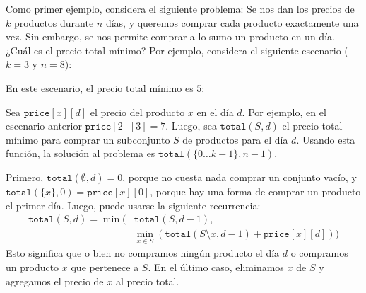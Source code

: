 Como primer ejemplo, considera el siguiente problema:
Se nos dan los precios de $k$ productos
durante $n$ días, y queremos comprar cada producto
exactamente una vez.
Sin embargo, se nos permite comprar a lo sumo un producto
en un día.
¿Cuál es el precio total mínimo?
Por ejemplo, considera el siguiente escenario ($k=3$ y $n=8$):
\begin{center}
\end{center}
En este escenario, el precio total mínimo es $5$:
\begin{center}
\end{center}

Sea $\texttt{price}[x][d]$ el precio del producto $x$
en el día $d$.
Por ejemplo, en el escenario anterior $\texttt{price}[2][3] = 7$.
Luego, sea $\texttt{total}(S,d)$ el precio total mínimo
para comprar un subconjunto $S$ de productos para el día $d$.
Usando esta función, la solución al problema es
$\texttt{total}(\{0 \ldots k-1\},n-1)$.

Primero, $\texttt{total}(\emptyset,d) = 0$,
porque no cuesta nada comprar un conjunto vacío,
y $\texttt{total}(\{x\},0) = \texttt{price}[x][0]$,
porque hay una forma de comprar un producto el primer día.
Luego, puede usarse la siguiente recurrencia:
\begin{equation*}
\begin{split}
\texttt{total}(S,d) = \min( & \texttt{total}(S,d-1), \\
& \min_{x \in S} (\texttt{total}(S \setminus x,d-1)+\texttt{price}[x][d]))
\end{split}
\end{equation*}
Esto significa que o bien no compramos ningún producto el día $d$
o compramos un producto $x$ que pertenece a $S$.
En el último caso, eliminamos $x$ de $S$ y agregamos el
precio de $x$ al precio total.

